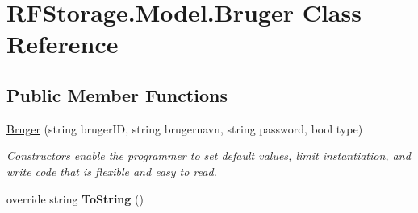 \hypertarget{class_r_f_storage_1_1_model_1_1_bruger}{}\section{R\+F\+Storage.\+Model.\+Bruger Class Reference}
\label{class_r_f_storage_1_1_model_1_1_bruger}
\subsection*{Public Member Functions}
\begin{DoxyCompactItemize}
\item 
\mbox{\hyperlink{class_r_f_storage_1_1_model_1_1_bruger_ad75e407d3a7660f2d9be2addf06b939e}{Bruger}} (string bruger\+ID, string brugernavn, string password, bool type)
\begin{DoxyCompactList}\small\item\em Constructors enable the programmer to set default values, limit instantiation, and write code that is flexible and easy to read. \end{DoxyCompactList}\item 
\mbox{\label{class_r_f_storage_1_1_model_1_1_bruger_a7cb0c16cb955a95f03c20c62192528d3}} 
override string {\bfseries To\+String} ()
\end{DoxyCompactItemize}
